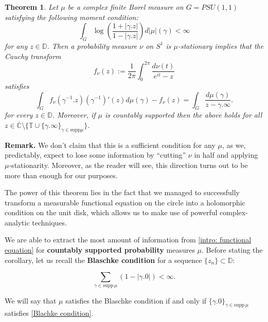 \documentclass[11pt]{article}
\newtheorem{theorem}{Theorem}[section]
\begin{document}
\begin{theorem}
	\label{T:main result}
	Let $\mu$ be a complex finite Borel measure on $G=PSU(1,1)$ satisfying the following moment condition:
	\begin{equation}
		\int_{G} \log\left( \frac{1 + |\gamma.z| }{1 - |\gamma.z|} \right)  d |\mu| (\gamma) < \infty
	\end{equation}
	for any $z \in \mathbb{D}$.	Then a probability measure $\nu$ on $S^1$ is $\mu$-stationary implies that the Cauchy transform 
	\[
	f_\nu(z) := \frac{1}{2\pi} \int_{0}^{2\pi} \dfrac{d\nu(t)}{e^{it} - z}
	\] 
	satisfies
	\begin{equation}
		\label{intro: functional equation}
		\int_G f_\nu(\gamma^{-1}.z)(\gamma^{-1})'(z)  d\mu(\gamma) - f_\nu(z) = \int_G \frac{d \mu(\gamma)}{z - \gamma.\infty}.
	\end{equation}
	for every $z \in \mathbb{D}$. Moreover, if $\mu$ is countably supported then the above holds for all \\ $z \in \overline{\mathbb{C}} \setminus \{ \mathbb{T} \cup \{ \gamma.\infty \}_{\gamma \in \text{supp} \mu } \}$.
\end{theorem}

\textbf{Remark.} We don't claim that this is a sufficient condition for any $\mu$, as we, predictably, expect to lose some information by ``cutting'' $\nu$ in half and applying $\mu$-stationarity. Moreover, as the reader will see, this direction turns out to be more than enough for our purposes.

The power of this theorem lies in the fact that we managed to successfully transform a measurable functional equation on the circle into a holomorphic condition on the unit disk, which allows us to make use of powerful complex-analytic techniques.

We are able to extract the most amount of information from \eqref{intro: functional equation} for \textbf{countably supported probability} measures $\mu$. Before stating the corollary, let us recall the \textbf{Blaschke condition} for a sequence $\{ z_n \} \subset \mathbb{D}$:

\begin{equation}
	\label{Blachke condition}
	\sum_{\gamma \in \text{supp} \, \mu} (1 - |\gamma.0|) < \infty.
\end{equation}

We will say that $\mu$ satisfies the Blaschke condition if and only if $\{ \gamma.0 \}_{\gamma \in \text{supp} \, \mu}$ satisfies \eqref{Blachke condition}.
\end{document}
